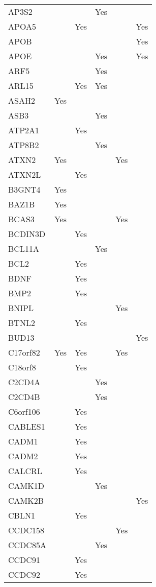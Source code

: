 \documentclass[]{report}
\begin{document}
\begin{appendices}
\begin{longtable}[t]{llllll}
AP3S2 &  &  & Yes &  & \\
APOA5 &  & Yes &  &  & Yes\\
APOB &  &  &  &  & Yes\\
APOE &  &  & Yes &  & Yes\\
ARF5 &  &  & Yes &  & \\
ARL15 &  & Yes & Yes &  & \\
ASAH2 & Yes &  &  &  & \\
ASB3 &  &  & Yes &  & \\
ATP2A1 &  & Yes &  &  & \\
ATP8B2 &  &  & Yes &  & \\
ATXN2 & Yes &  &  & Yes & \\
ATXN2L &  & Yes &  &  & \\
B3GNT4 & Yes &  &  &  & \\
BAZ1B & Yes &  &  &  & \\
BCAS3 & Yes &  &  & Yes & \\
BCDIN3D &  & Yes &  &  & \\
BCL11A &  &  & Yes &  & \\
BCL2 &  & Yes &  &  & \\
BDNF &  & Yes &  &  & \\
BMP2 &  & Yes &  &  & \\
BNIPL &  &  &  & Yes & \\
BTNL2 &  & Yes &  &  & \\
BUD13 &  &  &  &  & Yes\\
C17orf82 & Yes & Yes &  & Yes & \\
C18orf8 &  & Yes &  &  & \\
C2CD4A &  &  & Yes &  & \\
C2CD4B &  &  & Yes &  & \\
C6orf106 &  & Yes &  &  & \\
CABLES1 &  & Yes &  &  & \\
CADM1 &  & Yes &  &  & \\
CADM2 &  & Yes &  &  & \\
CALCRL &  & Yes &  &  & \\
CAMK1D &  &  & Yes &  & \\
CAMK2B &  &  &  &  & Yes\\
CBLN1 &  & Yes &  &  & \\
CCDC158 &  &  &  & Yes & \\
CCDC85A &  &  & Yes &  & \\
CCDC91 &  & Yes &  &  & \\
CCDC92 &  & Yes &  &  & \\

\end{longtable}
\end{appendices}
\end{document}
